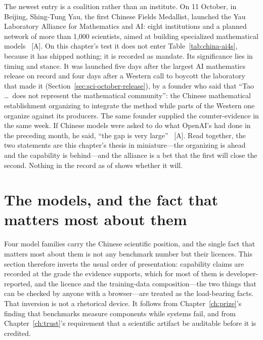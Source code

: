 The newest entry is a coalition rather than an institute. On 11 October, in Beijing, Shing-Tung Yau, the first Chinese Fields Medallist, launched the Yau Laboratory Alliance for Mathematics and AI: eight institutions and a planned network of more than 1,000 scientists, aimed at building specialized mathematical models~\cite{sci-yau-alliance,sci-officechai} [A]. On this chapter's test it does not enter Table~\ref{tab:china-ai4s}, because it has shipped nothing; it is recorded as mandate. Its significance lies in timing and stance. It was launched five days after the largest AI mathematics release on record and four days after a Western call to boycott the laboratory that made it (Section~\ref{sec:sci-october-release}), by a founder who said that ``Tao \ldots\ does not represent the mathematical community'': the Chinese mathematical establishment organizing to integrate the method while parts of the Western one organize against its producers. The same founder supplied the counter-evidence in the same week. If Chinese models were asked to do what OpenAI's had done in the preceding month, he said, ``the gap is very large''~\cite{sci-yau-alliance} [A]. Read together, the two statements are this chapter's thesis in miniature---the organizing is ahead and the capability is behind---and the alliance is a bet that the first will close the second. Nothing in the record as of \datafreeze shows whether it will.

\section{The models, and the fact that matters most about them}
\label{sec:china-ai4s-models}

Four model families carry the Chinese scientific position, and the single fact that matters most about them is not any benchmark number but their licences. This section therefore inverts the usual order of presentation: capability claims are recorded at the grade the evidence supports, which for most of them is developer-reported, and the licence and the training-data composition---the two things that can be checked by anyone with a browser---are treated as the load-bearing facts. That inversion is not a rhetorical device. It follows from Chapter~\ref{ch:prize}'s finding that benchmarks measure components while systems fail, and from Chapter~\ref{ch:trust}'s requirement that a scientific artifact be auditable before it is credited.

